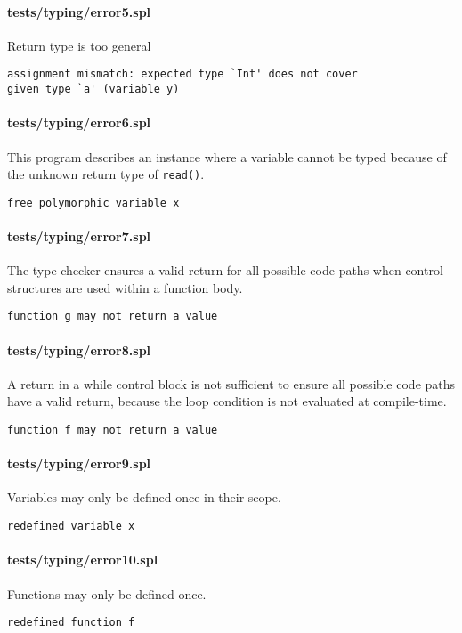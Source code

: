 \documentclass[a4paper]{article}
\begin{document}
\paragraph{tests/typing/error5.spl}
Return type is too general
    \begin{verbatim}
assignment mismatch: expected type `Int' does not cover
given type `a' (variable y)\end{verbatim}

\paragraph{tests/typing/error6.spl}
This program describes an instance where a variable cannot be typed because of the unknown return type of \verb|read()|.
    \begin{verbatim}
free polymorphic variable x\end{verbatim}

\paragraph{tests/typing/error7.spl}
The type checker ensures a valid return for all possible code paths when control structures are used within a function body.
    \begin{verbatim}
function g may not return a value\end{verbatim}

\paragraph{tests/typing/error8.spl}
A return in a while control block is not sufficient to ensure all possible code paths have a valid return, because the loop condition is not evaluated at compile-time.
    \begin{verbatim}
function f may not return a value\end{verbatim}

\paragraph{tests/typing/error9.spl}
Variables may only be defined once in their scope.
    \begin{verbatim}
redefined variable x\end{verbatim}

\paragraph{tests/typing/error10.spl}
Functions may only be defined once.
    \begin{verbatim}
redefined function f\end{verbatim}
\end{document}
